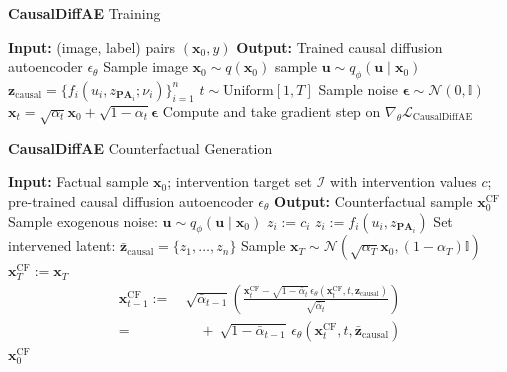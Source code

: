 \documentclass{article}
\newcommand{\x}{\mathbf{x}}
\newcommand{\ub}{\mathbf{u}}
\newcommand{\zc}{\textbf{z}_\text{causal}}
\newcommand{\N}{\mathcal{N}}
\newcommand{\eps}{\boldsymbol{\epsilon}}
\begin{document}
	\begin{algorithm}[H]
		\caption{\textbf{CausalDiffAE} Training}
		\begin{algorithmic}[1]
			\State \textbf{Input:} (image, label) pairs $(\x_0, y)$
			\State \textbf{Output:} Trained causal diffusion autoencoder $\epsilon_\theta$
			\Repeat
			\State Sample image $\x_0\sim q(\x_0)$
			\State {} sample $\ub \sim q_\phi (\ub \mid \x_0)$
			\State {} $\zc = \{f_i(u_i, z_{\textbf{PA}_i}; \nu_i)\}_{i=1}^n$
			\State {} $t \sim \mathrm{Uniform}[1, T]$
			\State Sample noise $\eps \sim \mathcal{N}(0, \mathbb{I})$
			\State {} $\x_t = \sqrt{\alpha_t} \x_0 + \sqrt{1-\alpha_t} \eps$
			\State Compute and take gradient step on $\nabla_\theta \mathcal{L}_{\mathrm{CausalDiffAE}}$
		\end{algorithmic}
	\end{algorithm}
	
	\begin{algorithm}[H]
		\caption{\textbf{CausalDiffAE} Counterfactual Generation}
		\label{alg:causaldiffae_counterfactual_generation}
		\begin{algorithmic}[1]
			\State \textbf{Input:} Factual sample $\x_0$; intervention target set $\mathcal{I}$ with intervention values $c$;\, pre-trained causal diffusion autoencoder $\epsilon_\theta$
			\State \textbf{Output:} Counterfactual sample $\x_0^{\text{CF}}$
			\State Sample exogenous noise: $\ub \sim q_\phi(\ub \mid \x_0)$
					\State $z_i := c_i$
				\Else
					\State $z_i := f_i(u_i, z_{\textbf{PA}_i})$
				\EndIf
			\EndFor
			\State Set intervened latent: $\bar{\textbf{z}}_\text{causal} = \{z_1, \ldots, z_n\}$
			\State Sample $\x_T \sim \N (\sqrt{\alpha_T} \x_0, (1 - \alpha_T) \mathbb{I})$
			\State $\x^{\text{CF}}_T := \x_T$
				\State \begin{align*}
					\x^{\text{CF}}_{t-1} :=\  &
					\sqrt{\bar{\alpha}_{t-1}}\left( \frac{\x^{\text{CF}}_t - \sqrt{1-\bar{\alpha}_t}\,\epsilon_\theta(\x^{\text{CF}}_t, t, \zc)}{\sqrt{\bar{\alpha}_t}} \right)  \\=
					&\quad +\ \sqrt{1 - \bar{\alpha}_{t-1}}\, \epsilon_\theta(\x^{\text{CF}}_t, t, \bar{\textbf{z}}_\text{causal})
				\end{align*}
			\EndFor
			\State \Return $\x^{\text{CF}}_0$
		\end{algorithmic}
	\end{algorithm}
	
\end{document}
